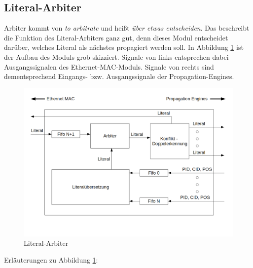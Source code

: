 \subsection{Literal-Arbiter}
\label{arbiter}
Arbiter kommt von \textit{to arbitrate} und heißt \textit{über etwas entscheiden}.
Das beschreibt die Funktion des Literal-Arbiters ganz gut, denn dieses
Modul entscheidet darüber, welches Literal als nächstes propagiert werden soll.
In Abbildung \ref{literal_arbiter} ist der Aufbau des Moduls grob skizziert. 
Signale von links entsprechen dabei Ausgangssignalen
des Ethernet-MAC-Moduls. Signale von rechts sind dementsprechend
Eingangs- bzw. Ausgangssignale der Propagation-Engines.\\
\begin{figure}[h]
  \includegraphics[width=\textwidth]{abb/literal_arbiter.png}
  \caption{Literal-Arbiter}
  \label{literal_arbiter}
\end{figure}Erläuterungen zu Abbildung \ref{literal_arbiter}:

